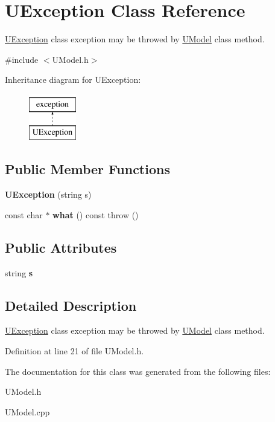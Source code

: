 \hypertarget{classUException}{}\section{U\+Exception Class Reference}
\label{classUException}


\hyperlink{classUException}{U\+Exception} class exception may be throwed by \hyperlink{classUModel}{U\+Model} class method.  




{\ttfamily \#include $<$U\+Model.\+h$>$}

Inheritance diagram for U\+Exception\+:\begin{figure}[H]
\begin{center}
\leavevmode
\includegraphics[height=2.000000cm]{dc/d20/classUException}
\end{center}
\end{figure}
\subsection*{Public Member Functions}
\begin{DoxyCompactItemize}
\item 
\mbox{\label{classUException_af42bf9ef5955b6c5b72e5752851bc08a}} 
{\bfseries U\+Exception} (string s)
\item 
\mbox{\label{classUException_aee2e2a2e410dcba75cdf97d2b69f77e9}} 
const char $\ast$ {\bfseries what} () const  throw ()
\end{DoxyCompactItemize}
\subsection*{Public Attributes}
\begin{DoxyCompactItemize}
\item 
\mbox{\label{classUException_af8f9712643669ed65329aff35cabf6fc}} 
string {\bfseries s}
\end{DoxyCompactItemize}


\subsection{Detailed Description}
\hyperlink{classUException}{U\+Exception} class exception may be throwed by \hyperlink{classUModel}{U\+Model} class method. 

Definition at line 21 of file U\+Model.\+h.



The documentation for this class was generated from the following files\+:\begin{DoxyCompactItemize}
\item 
U\+Model.\+h\item 
U\+Model.\+cpp\end{DoxyCompactItemize}
